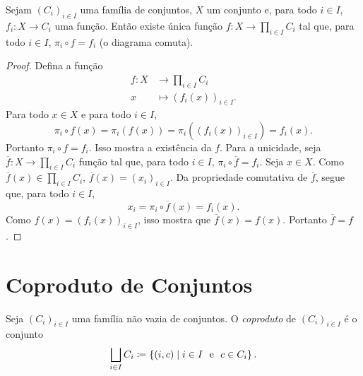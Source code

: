 \begin{prop}
Sejam $(C_i)_{i \in I}$ uma família de conjuntos, $X$ um conjunto e, para todo $i \in I$, $f_i: X \to C_i$ uma função. Então existe única função $f: X \to \prod_{i \in I} C_i$ tal que, para todo $i \in I$, $\pi_i \circ f = f_i$ (o diagrama comuta).
\begin{figure}[!h]
\centering
{}
\end{figure}
\end{prop}
\begin{proof}
Defina a função
	\begin{align*}
	f: X &\to \prod_{i \in I} C_i \\
		x &\mapsto (f_i(x))_{i \in I}.
	\end{align*}
Para todo $x \in X$ e para todo $i \in I$,
	\begin{equation*}
	\pi_i \circ f(x) = \pi_i (f(x)) = \pi_i ((f_i(x))_{i \in I}) = f_i(x).
	\end{equation*}
Portanto $\pi_i \circ f = f_i$. Isso mostra a existência da $f$. Para a unicidade, seja $\overline{f}: X \to \prod_{i \in I} C_i$ função tal que, para todo $i \in I$, $\pi_i \circ \overline{f} = f_i$. Seja $x \in X$.  Como $\overline{f}(x) \in \prod_{i \in I} C_i$, $\overline{f}(x) = (x_i)_{i \in I}$. Da propriedade comutativa de $\overline{f}$, segue que, para todo $i \in I$,
	\begin{equation*}
	x_i = \pi_i \circ \overline{f}(x) = f_i(x).
	\end{equation*}
Como $f(x) = (f_i(x))_{i \in I}$, isso mostra que $\overline{f}(x) = f(x)$. Portanto $\overline{f} = f$.
\end{proof}

\section{Coproduto de Conjuntos}

\begin{defi}
Seja $(C_i)_{i \in I}$ uma família não vazia de conjuntos. O \emph{coproduto} de $(C_i)_{i \in I}$ é o conjunto
	\begin{equation*}
	\bigsqcup_{i \in I} C_i \coloneqq\left\{(i,c) \;\middle\vert\; i \in I \text{\ \ e\ \ } c \in C_i \right\}.
	\end{equation*}
\end{defi}

